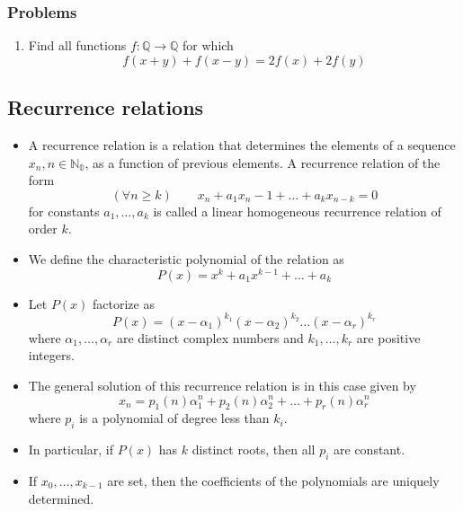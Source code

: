 \documentclass{article}
\begin{document}
		\subsubsection*{Problems}
			\begin{enumerate}[resume]
				\item Find all functions $f: \mathbb{Q} \to \mathbb{Q}$ for which
				$$f(x+y) + f(x-y) = 2f(x) + 2f(y) $$
			\end{enumerate}

\subsection*{Recurrence relations}
\begin{itemize}
	\item 
	A recurrence relation is a relation that determines the elements of a sequence $x_n, n \in \mathbb{N_0}$, as a function of previous elements. A recurrence relation of the form
	$$(\forall n \geq k) \hspace{2em} x_n + a_1x_n-1 + \hdots + a_kx_{n-k} = 0$$
	for constants $a_1, \hdots, a_k$ is called a linear homogeneous recurrence relation of order $k$.
	\item
	We define the characteristic polynomial of the relation as 
	$$P(x) = x^k + a_1x^{k-1} + \hdots + a_k$$
	\item
	Let $P(x)$	factorize as 
	$$P(x) = (x-\alpha_1)^{k_1}(x-\alpha_2)^{k_2} \hdots (x-\alpha_r)^{k_r}$$
	where $\alpha_1, \hdots , \alpha_r$ are distinct complex numbers and $k_1, \hdots, k_r$ are positive integers. 
	\item 
	The general solution of this recurrence relation is in this case given by
	$$x_n = p_1(n)\alpha_1^n + p_2(n)\alpha_2^n + \hdots + p_r(n)\alpha_r^n$$
	where $p_i$ is a polynomial of degree less than $k_i$.
	\item
	In particular, if $P(x)$ has $k$
	distinct roots, then all $p_i$ are constant.
	\item 
	If $x_0, \hdots, x_{k-1}$ are set, then the coefficients of the polynomials are uniquely determined.
\end{itemize}
\end{document}
